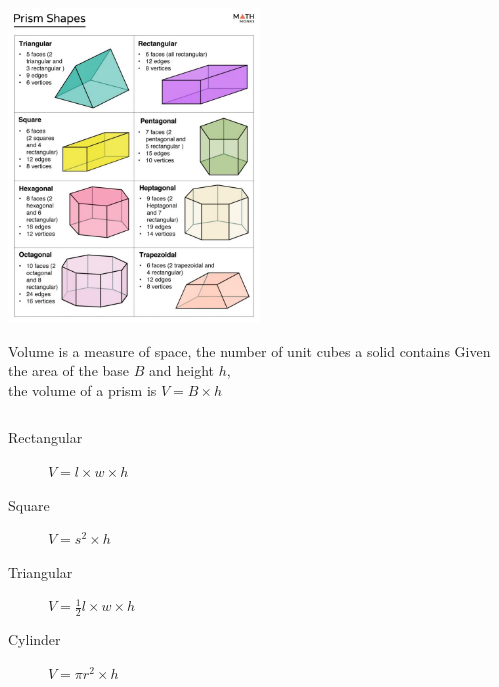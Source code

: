 \begin{frame}
  \includegraphics[width=0.5\textwidth]{../graphics/prism-shapes-768x960.jpeg}
\end{frame}

\begin{frame}{Volume is a measure of space, the number of unit cubes a solid contains}
  Given the area of the base $B$ and height $h$, \\
  the volume of a prism is $V= B \times h$
  \vspace{0.5cm}
  \begin{columns}
    \begin{description}
      \item[Rectangular] $V= l \times w \times h$
      \item[Square] $V= s^2 \times h$
      \item[Triangular] $V= \frac{1}{2} l \times w \times h$
      \item[Cylinder] $V= \pi r^2 \times h$ 
    \end{description}
  \end{columns} \vspace{0.5cm}
  \end{frame}

